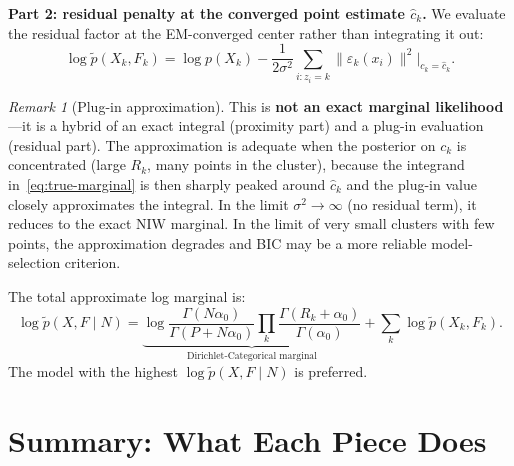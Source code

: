 \documentclass[11pt]{article}
\theoremstyle{definition}
\theoremstyle{plain}
\theoremstyle{remark}
\newtheorem{remark}{Remark}[section]
\begin{document}
\textbf{Part 2: residual penalty at the converged point estimate $\hat{c}_k$.} We evaluate the residual factor at the EM-converged center rather than integrating it out:
\begin{equation}
  \log\widetilde{p}(X_k,F_k) = \log p(X_k) - \frac{1}{2\sigma^2}\sum_{i:z_i=k}\|\varepsilon_k(x_i)\|^2\Biggr|_{c_k=\hat{c}_k}.
\end{equation}

\begin{remark}[Plug-in approximation]
This is \textbf{not an exact marginal likelihood}---it is a hybrid of an exact integral (proximity part) and a plug-in evaluation (residual part). The approximation is adequate when the posterior on $c_k$ is concentrated (large $R_k$, many points in the cluster), because the integrand in~\eqref{eq:true-marginal} is then sharply peaked around $\hat{c}_k$ and the plug-in value closely approximates the integral. In the limit $\sigma^2\to\infty$ (no residual term), it reduces to the exact NIW marginal. In the limit of very small clusters with few points, the approximation degrades and BIC may be a more reliable model-selection criterion.
\end{remark}

The total approximate log marginal is:
\begin{equation}
  \log\widetilde{p}(X,F\mid N) = \underbrace{\log\frac{\Gamma(N\alpha_0)}{\Gamma(P+N\alpha_0)}\prod_k\frac{\Gamma(R_k+\alpha_0)}{\Gamma(\alpha_0)}}_{\text{Dirichlet-Categorical marginal}} + \sum_k\log\widetilde{p}(X_k,F_k).
\end{equation}
The model with the highest $\log\widetilde{p}(X,F\mid N)$ is preferred.

\section{Summary: What Each Piece Does}
\end{document}

